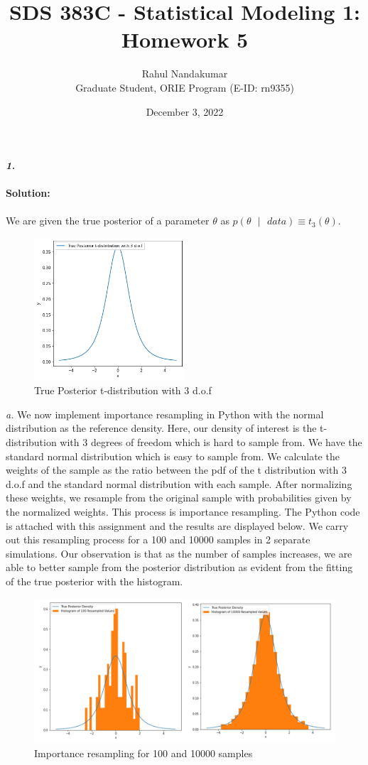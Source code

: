 \documentclass[11pt]{article}
\title{SDS 383C - Statistical Modeling 1: Homework 5}
\author{Rahul Nandakumar \\ Graduate Student, ORIE Program (E-ID: rn9355)}
\date{December 3, 2022}
\begin{document}
\maketitle
\noindent \textbf{\emph{1.}}\\ \\
\textbf{Solution:}\\ \\
We are given the true posterior of a parameter $\theta$ as $p(\theta \text{ }|\text{ } data) \equiv t_{3}(\theta)$.
\begin{figure}[H]
  \centering
  \includegraphics[width = 0.5\textwidth]{1a.png}
  \caption{True Posterior t-distribution with 3 d.o.f}
\end{figure}
\noindent \emph{a.} We now implement importance resampling in Python with the normal distribution as the reference density. Here, our density of interest is the t-distribution with 3 degrees of freedom which is hard to sample from. We have the standard normal distribution which is easy to sample from. We calculate the weights of the sample as the ratio between the pdf of the t distribution with 3 d.o.f and the standard normal distribution with each sample. After normalizing these weights, we resample from the original sample with probabilities given by the normalized weights. This process is importance resampling. The Python code is attached with this assignment and the results are displayed below. We carry out this resampling process for a 100 and 10000 samples in 2 separate simulations. Our observation is that as the number of samples increases, we are able to better sample from the posterior distribution as evident from the fitting of the true posterior with the histogram.
\begin{figure}[H]
  \centering
  \includegraphics[width = 1\textwidth]{Importance Resampling Plots.jpg}
  \caption{Importance resampling for 100 and 10000 samples}
\end{figure}
\end{document}
